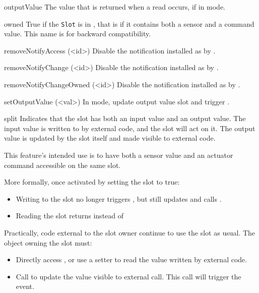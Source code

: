 \begin{urbiscriptapi}
\item[outputValue]%
  The value that is returned when a read occurs, if in  mode.


\item[owned]%
  True if the \lstinline|Slot| is in , that is if it
  contains both a sensor and a command value. This name is for backward
  compatibility.


\item[removeNotifyAccess](<id>)%
  Disable the notification installed as  by .


\item[removeNotifyChange](<id>)%
  Disable the notification installed as  by .


\item[removeNotifyChangeOwned](<id>)%
  Disable the notification installed as  by
  .

\item[setOutputValue](<val>)%
  In  mode, update output value slot  and
  trigger .


\item[split]%
  Indicates that the slot has both an input value and an output value.  The
  input value is written to by external code, and the slot will act on it.
  The output value is updated by the slot itself and made visible to
  external code.

  This feature's intended use is to have both a sensor value and an actuator
  command accessible on the same slot.

  More formally, once activated by setting the  slot to true:
\begin{itemize}
\item Writing to the slot no longer triggers , but still
  updates  and calls .
\item Reading the slot returns  instead of
\end{itemize}

Practically, code external to the slot owner continue to use the slot as
usual.  The object owning the slot must:
\begin{itemize}
\item Directly access , or use a setter to read the value
  written by external code.
\item Call  to update the value visible to external
  call.  This call will trigger the  event.
\end{itemize}


\end{urbiscriptapi}
